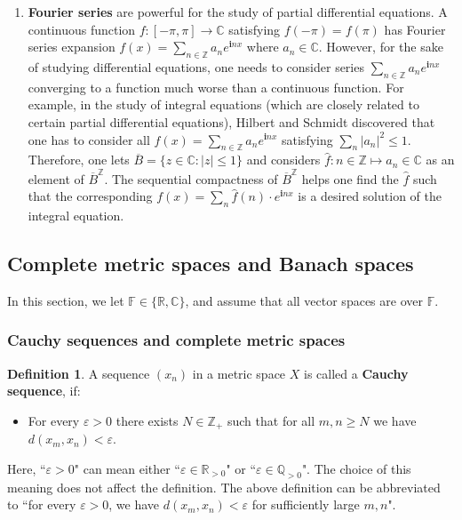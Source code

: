 \documentclass[12pt,b5paper,notitlepage]{article}
\theoremstyle{definition}
\newtheorem{df}{Definition}[section]
\theoremstyle{plain}
\newcommand{\wht}{\widehat}
\newcommand{\ovl}{\overline}
\newcommand{\im}{\mathbf{i}}
\newcommand{\Cbb}{\mathbb C}
\newcommand{\Zbb}{\mathbb Z}
\newcommand{\Qbb}{\mathbb Q}
\newcommand{\Rbb}{\mathbb R}
\newcommand{\Fbb}{\mathbb F}
\newcommand{\eps}{\varepsilon}
\numberwithin{equation}{section}
\begin{document}
\begin{enumerate}
\item \textbf{Fourier series} are powerful for the study of partial differential equations. A continuous function $f:[-\pi,\pi]\rightarrow\Cbb$ satisfying $f(-\pi)=f(\pi)$ has Fourier series expansion $f(x)=\sum_{n\in\Zbb}a_n e^{\im nx}$ where $a_n\in\Cbb$. However, for the sake of studying differential equations, one needs to consider series $\sum_{n\in\Zbb}a_n e^{\im nx}$ converging to a function much worse than a continuous function. For example, in the study of integral equations (which are closely related to certain partial differential equations), Hilbert and Schmidt discovered that one has to consider all $f(x)=\sum_{n\in\Zbb}a_n e^{\im nx}$ satisfying $\sum_n |a_n|^2\leq 1$. Therefore, one lets $\ovl B=\{z\in\Cbb:|z|\leq 1\}$ and considers $\wht f:n\in\Zbb\mapsto a_n\in\Cbb$ as an element of $\ovl B^\Zbb$. The sequential compactness of $\ovl B^\Zbb$ helps one find the $\wht f$ such that the corresponding $f(x)=\sum_n \wht f(n)\cdot e^{\im nx}$ is a desired solution of the integral equation. 
\end{enumerate}




\subsection{Complete metric spaces and Banach spaces}

In this section, we let $\Fbb\in\{\Rbb,\Cbb\}$, and assume that all vector spaces are over $\Fbb$.


\subsubsection{Cauchy sequences and complete metric spaces}

\begin{df}
A sequence $(x_n)$ in a metric space $X$ is called a \textbf{Cauchy sequence}, if:
\begin{itemize}
\item For every $\eps>0$  there exists $N\in\Zbb_+$ such that for all $m,n\geq N$ we have $d(x_m,x_n)<\eps$.
\end{itemize}
\end{df}

Here, ``$\eps>0$" can mean either ``$\eps\in\Rbb_{>0}$" or ``$\eps\in\Qbb_{>0}$". The choice of this meaning does not affect the definition. The above definition can be abbreviated to ``for every $\eps>0$, we have $d(x_m,x_n)<\eps$ for sufficiently large $m,n$". 
\end{document}
